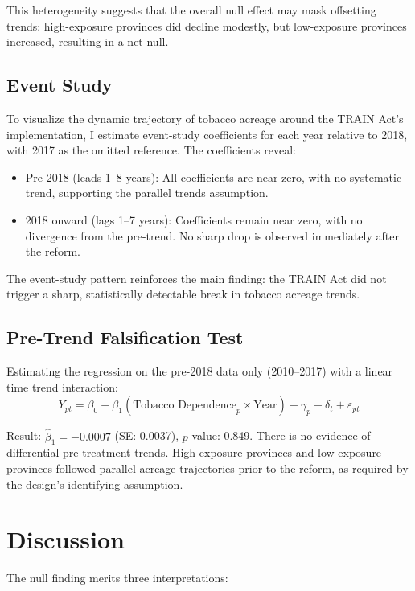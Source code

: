 \documentclass[12pt]{article}
\begin{document}
This heterogeneity suggests that the overall null effect may mask offsetting trends: high-exposure provinces did decline modestly, but low-exposure provinces increased, resulting in a net null.

\subsection{Event Study}

To visualize the dynamic trajectory of tobacco acreage around the TRAIN Act's implementation, I estimate event-study coefficients for each year relative to 2018, with 2017 as the omitted reference. The coefficients reveal:
\begin{itemize}
\item Pre-2018 (leads 1--8 years): All coefficients are near zero, with no systematic trend, supporting the parallel trends assumption.
\item 2018 onward (lags 1--7 years): Coefficients remain near zero, with no divergence from the pre-trend. No sharp drop is observed immediately after the reform.
\end{itemize}

The event-study pattern reinforces the main finding: the TRAIN Act did not trigger a sharp, statistically detectable break in tobacco acreage trends.

\subsection{Pre-Trend Falsification Test}

Estimating the regression on the pre-2018 data only (2010--2017) with a linear time trend interaction:
\begin{equation}
Y_{pt} = \beta_0 + \beta_1 (\text{Tobacco Dependence}_p \times \text{Year}) + \gamma_p + \delta_t + \varepsilon_{pt}
\end{equation}

Result: $\hat{\beta}_1 = -0.0007$ (SE: 0.0037), $p$-value: 0.849. There is no evidence of differential pre-treatment trends. High-exposure provinces and low-exposure provinces followed parallel acreage trajectories prior to the reform, as required by the design's identifying assumption.

\section{Discussion}

The null finding merits three interpretations:
\end{document}
